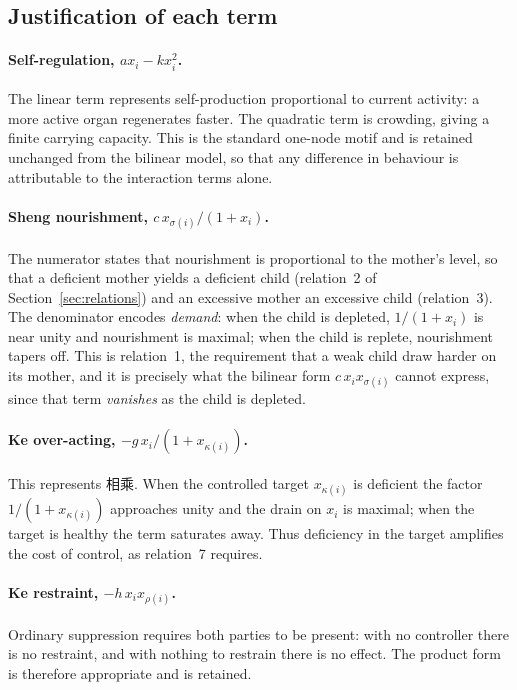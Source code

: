 \documentclass[11pt]{article}
\begin{document}
\subsection{Justification of each term}

\paragraph{Self-regulation, $a x_i - k x_i^2$.}
The linear term represents self-production proportional to current activity: a
more active organ regenerates faster. The quadratic term is crowding, giving a
finite carrying capacity. This is the standard one-node motif and is retained
unchanged from the bilinear model, so that any difference in behaviour is
attributable to the interaction terms alone.

\paragraph{Sheng nourishment, $c\,x_{\sigma(i)}/(1+x_i)$.}
The numerator states that nourishment is proportional to the mother's level, so
that a deficient mother yields a deficient child (relation~2 of
Section~\ref{sec:relations}) and an excessive mother an excessive child
(relation~3). The denominator encodes \emph{demand}: when the child is depleted,
$1/(1+x_i)$ is near unity and nourishment is maximal; when the child is replete,
nourishment tapers off. This is relation~1, the requirement that a weak child
draw harder on its mother, and it is precisely what the bilinear form
$c\,x_ix_{\sigma(i)}$ cannot express, since that term \emph{vanishes} as the
child is depleted.

\paragraph{Ke over-acting, $-g\,x_i/(1+x_{\kappa(i)})$.}
This represents 相乘. When the controlled target $x_{\kappa(i)}$ is deficient the
factor $1/(1+x_{\kappa(i)})$ approaches unity and the drain on $x_i$ is maximal;
when the target is healthy the term saturates away. Thus deficiency in the target
amplifies the cost of control, as relation~7 requires.

\paragraph{Ke restraint, $-h\,x_i x_{\rho(i)}$.}
Ordinary suppression requires both parties to be present: with no controller
there is no restraint, and with nothing to restrain there is no effect. The
product form is therefore appropriate and is retained.
\end{document}
